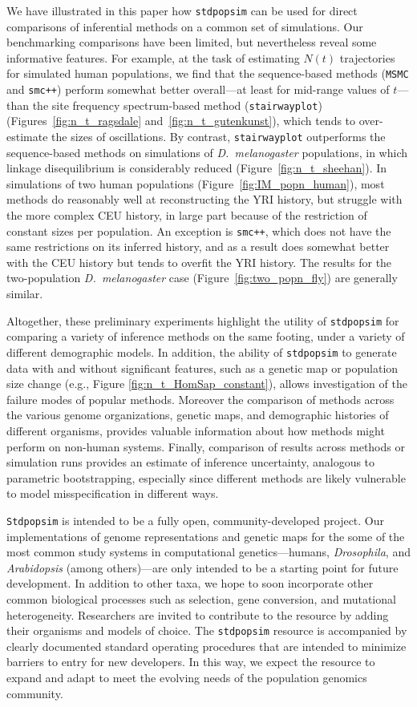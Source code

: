 \documentclass[12pt,halfline,a4paper]{ouparticle}
\newcommand{\Stdpopsim}{\texttt{Stdpopsim}\xspace}
\newcommand{\stdpopsim}{\texttt{stdpopsim}\xspace}
\newcommand{\MSMC}{\texttt{MSMC}\xspace}
\newcommand{\smcpp}{\texttt{smc++}\xspace}
\newcommand{\stairwayplot}{\texttt{stairwayplot}\xspace}
\begin{document}
We have illustrated in this paper how \stdpopsim can be used for direct
comparisons of inferential methods on a common set of simulations. Our
benchmarking comparisons have been limited, but nevertheless
reveal some informative features. For
example, at the task of estimating $N(t)$ trajectories for simulated human
populations, we find that the sequence-based methods (\MSMC and \smcpp)
perform somewhat better overall---at least for mid-range values of
$t$---than the site frequency spectrum-based method (\stairwayplot)
(Figures~\ref{fig:n_t_ragsdale} and~\ref{fig:n_t_gutenkunst}), which
tends to over-estimate the sizes of oscillations.  By contrast,
\stairwayplot outperforms the sequence-based methods
on simulations of \textit{D.~melanogaster} populations,
in which linkage disequilibrium is considerably reduced (Figure~\ref{fig:n_t_sheehan}).
In simulations of two human populations
(Figure~\ref{fig:IM_popn_human}), most methods do reasonably well at
reconstructing the YRI history, but struggle with the more complex CEU
history, in large part because of the restriction of constant sizes per
population.  An exception is \smcpp, which does not have the same
restrictions on its inferred history, and as a result does somewhat better
with the CEU history but tends to overfit the YRI history.  The results for
the two-population \textit{D.~melanogaster} case (Figure~\ref{fig:two_popn_fly})
are generally similar.

Altogether, these preliminary experiments highlight
the utility of \stdpopsim for comparing a variety of inference methods on
the same footing, under a variety of different demographic models.
In addition, the ability of \stdpopsim to generate data with and without significant features, such
as a genetic map or population size change (e.g., Figure \ref{fig:n_t_HomSap_constant}), allows
investigation of the failure modes of popular methods.
Moreover the comparison of methods across the various genome organizations, genetic maps,
and demographic histories of different organisms, provides valuable information
about how methods might perform on non-human systems.
Finally, comparison of results across methods or simulation runs
provides an estimate of inference uncertainty, analogous to parametric
bootstrapping,
especially since different methods are likely vulnerable to model misspecification
in different ways.

\Stdpopsim is intended to be a fully open, community-developed project.
Our implementations of genome representations and genetic maps for the some of
the most common study systems in computational genetics---humans, \textit{Drosophila},
and \textit{Arabidopsis} (among others)---are only intended to be a starting point for
future development.  In addition to other taxa,
we hope to soon incorporate other common biological processes
such as selection, gene conversion, and mutational heterogeneity.
Researchers are invited to contribute to the resource by adding their
organisms and models of choice. The \stdpopsim resource is
accompanied by clearly documented standard operating procedures that are
intended to minimize barriers to entry for new developers.  In this way, we
expect the resource to expand and adapt to meet the evolving needs of the
population genomics community.
\end{document}
